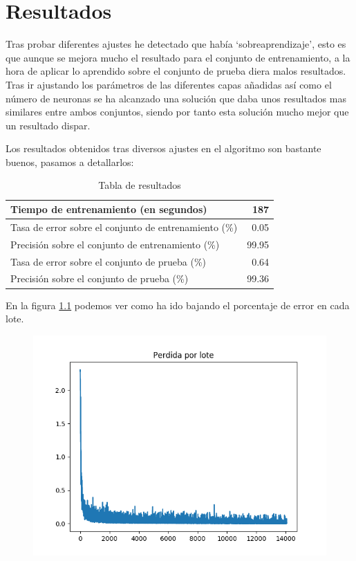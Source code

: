 \chapter{Resultados}

Tras probar diferentes ajustes he detectado que había `sobreaprendizaje', esto es que aunque se mejora mucho el resultado para el conjunto de entrenamiento, a la hora de aplicar lo aprendido sobre el conjunto de prueba diera malos resultados. Tras ir ajustando los parámetros de las diferentes capas añadidas así como el número de neuronas se ha alcanzado una solución que daba unos resultados mas similares entre ambos conjuntos, siendo por tanto esta solución mucho mejor que un resultado dispar.

\bigskip
Los resultados obtenidos tras diversos ajustes en el algoritmo son bastante buenos, pasamos a detallarlos:

\begin{table}[H]
\centering

\begin{tabular}{|l|r|}
\hline
Tiempo de entrenamiento (en segundos)                 & 187  \\ \hline
Tasa de error sobre el conjunto de entrenamiento (\%) & 0.05  \\ \hline
Precisión sobre el conjunto de entrenamiento (\%)     & 99.95 \\ \hline
Tasa de error sobre el conjunto de prueba (\%)        & 0.64  \\ \hline
Precisión sobre el conjunto de prueba (\%)            & 99.36 \\ \hline
\end{tabular}
\caption{Tabla de resultados}

\end{table}

En la figura \ref{fig:plot} podemos ver como ha ido bajando el porcentaje de error en cada lote.

\begin{figure}[H]
\centering
\includegraphics[width=1.0\textwidth]{../images/plot}
\label{fig:plot}
\end{figure}


